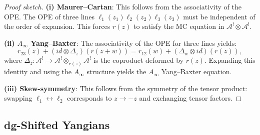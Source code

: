 \begin{proof}[Proof sketch]
\textbf{(i) Maurer--Cartan}: This follows from the associativity of the OPE. The OPE of three lines $\ell_1(z_1) \ell_2(z_2) \ell_3(z_3)$ must be independent of the order of expansion. This forces $r(z)$ to satisfy the MC equation in $\mathcal{A}^! \otimes \mathcal{A}^!$.

\textbf{(ii) $A_\infty$ Yang--Baxter}: The associativity of the OPE for three lines yields:
\begin{equation}
r_{23}(z) + (id \otimes \Delta_z)(r(z+w)) = r_{12}(w) + (\Delta_w \otimes id)(r(z)),
\end{equation}
where $\Delta_z : \mathcal{A}^! \to \mathcal{A}^! \otimes_{r(z)} \mathcal{A}^!$ is the coproduct deformed by $r(z)$. Expanding this identity and using the $A_\infty$ structure yields the $A_\infty$ Yang--Baxter equation.

\textbf{(iii) Skew-symmetry}: This follows from the symmetry of the tensor product: swapping $\ell_1 \leftrightarrow \ell_2$ corresponds to $z \to -z$ and exchanging tensor factors.
\end{proof}

\subsection{dg-Shifted Yangians}

